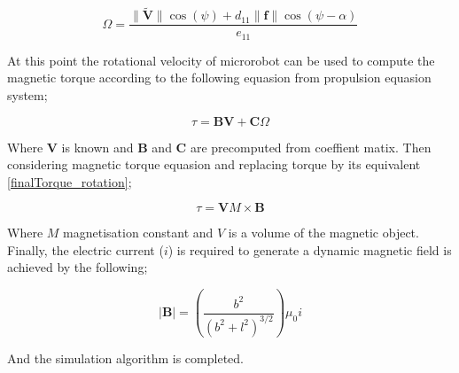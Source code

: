 \documentclass[12pt,a4paper,titlepage]{report}
\begin{document}
\begin{equation}
 \Omega  = \frac{\| {\tilde{\bm{V}} \|  \cos(\psi) }   + d_{11}  \| \bm{f} \| \cos(\psi - \alpha)}{e_{11}}
\label{FinalAngular_velo}  
\end{equation}

At this point the rotational velocity of microrobot can be used to compute the magnetic torque according to
the following equasion from propulsion equasion system;


\begin{equation}
 \tau = \bm{B} \bm{V} + \bm{C} \Omega 
\label{finalTorque_rotation}  
\end{equation}

Where $\bm{V}$ is known and $\bm{B}$ and $\bm{C}$ are precomputed from coeffient matix. Then considering
  magnetic torque equasion and replacing torque by its equivalent \ref{finalTorque_rotation};

\begin{equation}
 \tau = \bm{V}M \times \bm{B}
\label{finding-B}  
\end{equation}

Where $M$ magnetisation constant and $V$ is a volume of the magnetic object. Finally, the electric current 
($i$) is required to generate a dynamic magnetic field is achieved by the following; 


\begin{equation}
|\bm{B}| = (\frac{b^2}{(b^2+l^2)^{3/2}}){\mu}_0 i
\label{Current}  
\end{equation}


And the simulation algorithm is completed.

\end{document}
